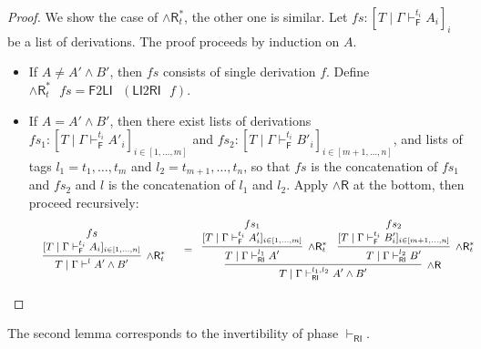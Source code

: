\documentclass[submission,copyright,creativecommons]{eptcs}
\theoremstyle{definition}
\newcommand{\andr}{\land \mathsf{R}}
\newcommand{\RI}{\mathsf{RI}}
\newcommand{\LI}{\mathsf{LI}}
\newcommand{\F}{\mathsf{F}}
\newcommand{\proofbox}[1]{\begin{tabular}{l} #1 \end{tabular}}
\begin{document}
\begin{proof}
  We show the case of $\andr^{*}_{t}$, the other one is similar.
  Let $fs : [T \mid \Gamma \vdash^{t_i}_{\F} A_i]_i$ be a list of derivations. The proof proceeds by induction on $A$.
  \begin{itemize}
    \item If $A \neq A' \land B'$, then $fs$ consists of single derivation $f$. Define $\andr^*_{t} \text{ } fs = \F 2 \LI \text{ } (\LI 2 \RI \text{ } f)$.
    \item If $A = A' \land B'$, then there exist lists of derivations $fs_1 : [T \mid \Gamma \vdash^{t_i}_{\F} A'_i]_{i \in [1 , \dots , m]}$ and $fs_2 : [T \mid \Gamma \vdash^{t_i}_{\F} B'_i]_{i \in [m+1 , \dots , n]}$, and lists of tags $l_1 = t_1 , \dots , t_m$ and $l_2 = t_{m+1} , \dots , t_n$, so that $fs$ is the concatenation of $fs_1$ and $fs_2$ and $l$ is the concatenation of $l_1 $ and $l_2$.
    Apply $\andr$ at the bottom, then proceed recursively:
    \begin{displaymath}
      \small
      \begin{array}{cc}
        \proofbox{
        \infer[\andr^*_{t}]{T \mid \Gamma \vdash^{l} A' \land B'}{
          \deduce{[T \mid \Gamma \vdash^{t_i}_{\F} A_i]_{i \in [1 , \dots , n]}}{fs}
        }
        }
        &
        =
        \proofbox{
        \infer[\andr]{T \mid \Gamma \vdash^{l_1 , l_2}_{\RI} A' \land B'}{
          \infer[\andr^{*}_{t}]{T \mid \Gamma \vdash^{l_1}_{\RI} A'}{
            \deduce{[T \mid \Gamma \vdash^{t_i}_{\F} A'_i]_{i \in [1 , \dots , m]}}{fs_1}
          }
          &
          \infer[\andr^{*}_{t}]{T \mid \Gamma \vdash^{l_2}_{\RI} B'}{
            \deduce{[T \mid \Gamma \vdash^{t_i}_{\F} B'_i]_{i \in [m+1 , \dots , n]}}{fs_2}
          }
        }
       }
      \end{array}
    \end{displaymath}
  \end{itemize}
\end{proof}

The second lemma corresponds to the invertibility of phase $\vdash_\RI$.
\end{document}
